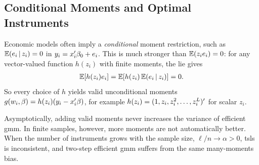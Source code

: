 \documentclass[a4paper,12pt]{article}
\begin{document}
\subsection{Conditional Moments and Optimal Instruments}

Economic models often imply a \emph{conditional} moment restriction, such as $\operatorname{\mathbb{E}}(e_i\mathpunct{}|\mathpunct{} z_i)=0$ in $y_i=x_i^{\prime}\beta_0+e_i$.
This is much stronger than $\operatorname{\mathbb{E}}(z_ie_i)=0$:
for any vector-valued function $h(z_i)$ with finite moments, the \gls{lie} gives
\begin{align}
	\operatorname{\mathbb{E}}[h(z_i)e_i]=\operatorname{\mathbb{E}}[h(z_i)\operatorname{\mathbb{E}}(e_i\mathpunct{}|\mathpunct{} z_i)]=0.
\end{align}
So every choice of $h$ yields valid unconditional moments $g(w_i,\beta)=h(z_i)(y_i-x_i^{\prime}\beta)$,
for example $h(z_i)=(1,z_i,z_i^2,\ldots,z_i^L)^{\prime}$ for scalar $z_i$.

\begin{remark}
	Asymptotically, adding valid moments never increases the variance of efficient \gls{gmm}.
	In finite samples, however, more moments are not automatically better.
	When the number of instruments grows with the sample size, $\ell/n\to\alpha>0$,
	\gls{tsls} is inconsistent,
	and two-step efficient \gls{gmm} suffers from the same many-moments bias.
\end{remark}
\end{document}
